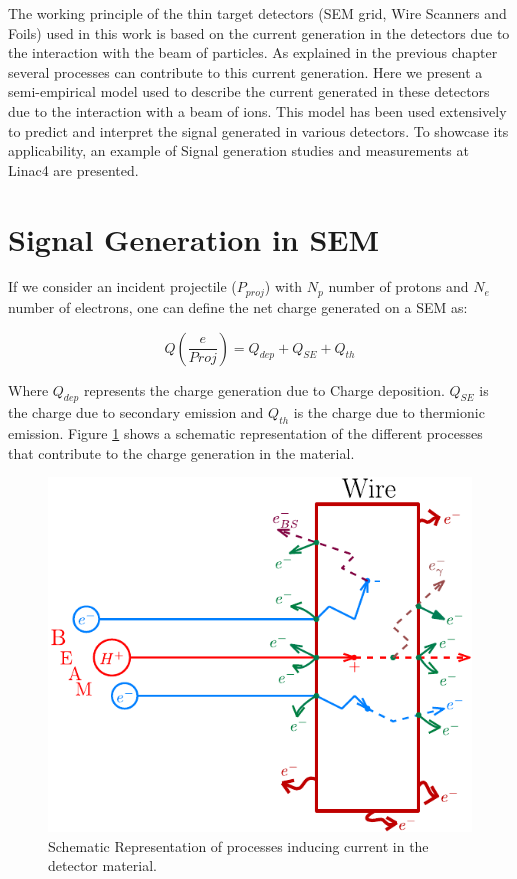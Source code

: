 \pagestyle{fancy}

\graphicspath{ {Figures/Chapter3_CurrentModeling/} }

The working principle of the thin target detectors (SEM grid, Wire Scanners and Foils) used in this work is based on the current generation in the detectors due to the interaction with the beam of particles. As explained in the previous chapter several processes can contribute to this current generation. Here we present a semi-empirical model used to describe the current generated in these detectors due to the interaction with a beam of ions. This model has been used extensively to predict and interpret the signal generated in various detectors. To showcase its applicability, an example of Signal generation studies and measurements at Linac4 are presented. 

\section{Signal Generation in SEM}

If we consider an incident projectile ($P_{proj}$) with $N_p$ number of protons and $N_e$ number of electrons, one can define the net charge generated on a SEM as:

\begin{equation}
    \label{eq:Qsum}
    Q\left(\frac{e}{Proj}\right) = Q_{dep} + Q_{SE} + Q_{th}
\end{equation}

Where $Q_{dep}$ represents the charge generation due to Charge deposition. $Q_{SE}$ is the charge due to secondary emission and $Q_{th}$ is the charge due to thermionic emission. Figure \ref{fig:SignalGeneration} shows a schematic representation of the different processes that contribute to the charge generation in the material. 

\begin{figure}[h]
    \centering
    \includegraphics[width=0.50\columnwidth]{Figure_ChargeGeneration/ChargeGen.pdf}
    \caption{Schematic Representation of processes inducing current in the detector material.}
    \label{fig:SignalGeneration}
\end{figure}

